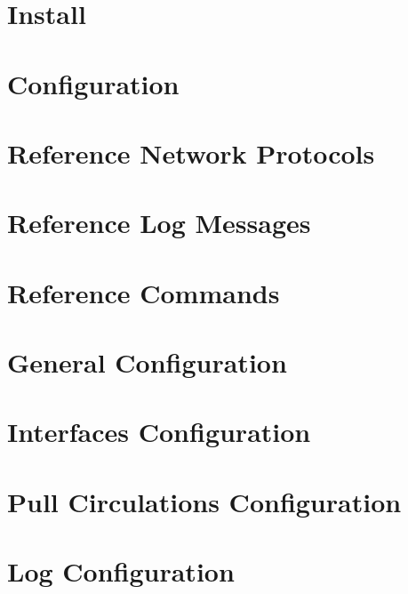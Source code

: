 \documentclass[
	oneside,
	openany,
	a4paper,
	headings=optiontoheadandtoc
	]{book}
\begin{document}
\chapter{Install}

 
\chapter{Configuration}


\chapter{Reference Network Protocols}


\chapter{Reference Log Messages}


\chapter{Reference Commands}


\appendix

\chapter{General Configuration}
 

\chapter{Interfaces Configuration}
 

\chapter{Pull Circulations Configuration}
 

\chapter{Log Configuration}

 
	
\end{document}
